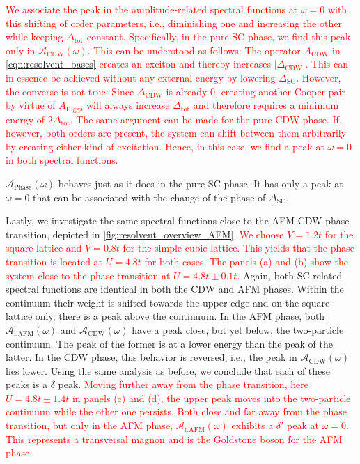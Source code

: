 \documentclass[
    reprint, 
    aps,
    preprintnumbers,
    twocolumn,
    prb,
    superscriptaddress
]{revtex4-2}
\newcommand{\spectral}[1]{\mathcal{A}_\text{#1}  (\omega)}
\begin{document}
\textcolor{red}{We associate the peak in the amplitude-related spectral functions at $\omega=0$ with this shifting of order parameters, i.e., diminishing one and increasing the other while keeping $\Delta_\text{tot}$ constant.
Specifically, in the pure SC phase, we find this peak only in $\spectral{CDW}$.
This can be understood as follows: The operator $A_\text{CDW}$ in \eqref{eqn:resolvent_bases} creates an exciton and thereby increases $|\Delta_\text{CDW}|$.
This can in essence be achieved without any external energy by lowering $\Delta_\text{SC}$.
However, the converse is not true: Since $\Delta_\text{CDW}$ is already 0, creating another Cooper pair by virtue of $A_\text{Higgs}$ will always increase $\Delta_\text{tot}$ and therefore requires a minimum energy of $2 \Delta_\text{tot}$.
The same argument can be made for the pure CDW phase.
If, however, both orders are present, the system can shift between them arbitrarily by creating either kind of excitation.
Hence, in this case, we find a peak at $\omega=0$ in both spectral functions.}

$\spectral{Phase}$ behaves just as it does in the pure SC phase. It has only a peak at $\omega = 0$ that can be associated with the change of the phase of $\Delta_\text{SC}$.


Lastly, we investigate the same spectral functions close to the AFM-CDW phase transition, depicted in \autoref{fig:resolvent_overview_AFM}.
\textcolor{red}{We choose $V=1.2t$ for the square lattice and $V=0.8t$ for the simple cubic lattice.
This yields that the phase transition is located at $U=4.8t$ for both cases. 
The panels (a) and (b) show the system close to the phase transition at $U=4.8t \pm 0.1t$.}
Again, both SC-related spectral functions are identical in both the CDW and AFM phases.
Within the continuum their weight is shifted towards the upper edge and on the square lattice only, there is a peak above the continuum.
In the AFM phase, both $\spectral{l.AFM}$ and $\spectral{CDW}$ have a peak close, but yet below, the two-particle continuum.
The peak of the former is at a lower energy than the peak of the latter.
In the CDW phase, this behavior is reversed, i.e., the peak in $\spectral{CDW}$ lies lower.
Using the same analysis as before, we conclude that each of these peaks is a $\delta$ peak.
\textcolor{red}{Moving further away from the phase transition, here $U=4.8t \pm 1.4t$ in panels (c) and (d), the upper peak moves into the two-particle continuum while the other one persists.
Both close and far away from the phase transition, but only in the AFM phase, $\spectral{t.AFM}$ exhibits a $\delta'$ peak at $\omega=0$.
This represents a transversal magnon and is the Goldstone boson for the AFM phase.}
\end{document}
